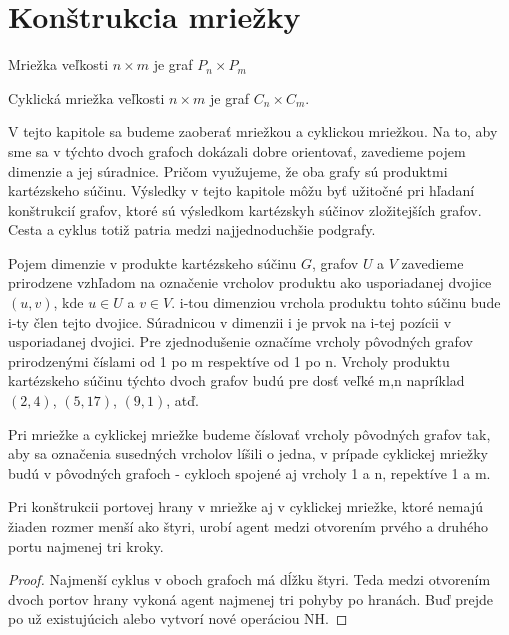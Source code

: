 \chapter{Konštrukcia mriežky}
\begin{defin}
Mriežka veľkosti $ n \times m$ je graf $P_{n} \times P_{m}$
\end{defin}
\begin{defin}
Cyklická mriežka veľkosti $n \times m$ je graf $C_{n} \times C_{m}$.
\end{defin}

V tejto kapitole sa budeme zaoberať mriežkou a cyklickou mriežkou. Na to, aby sme sa v
týchto dvoch grafoch dokázali dobre orientovať, zavedieme pojem dimenzie a
jej súradnice. Pričom využujeme, že oba grafy sú produktmi kartézskeho
súčinu. Výsledky v tejto kapitole môžu byť užitočné pri hľadaní konštrukcií
grafov, ktoré sú výsledkom kartézskyh súčinov zložitejších grafov. Cesta a
cyklus totiž patria medzi najjednoduchšie podgrafy.

\begin{ozn}
Pojem dimenzie v produkte kartézskeho súčinu $G$, grafov $U$ a $V$ 
zavedieme prirodzene vzhľadom
na označenie vrcholov produktu ako usporiadanej dvojice $(u,v)$, kde $u \in
U$ a $v \in V$. i-tou dimenziou vrchola produktu tohto súčinu bude i-ty člen
tejto dvojice. Súradnicou v dimenzii i je prvok na i-tej pozícii v
usporiadanej dvojici. Pre zjednodušenie označíme vrcholy pôvodných grafov
prirodzenými číslami od 1 po m respektíve od 1 po n. Vrcholy produktu
kartézskeho súčinu týchto dvoch grafov budú pre dosť veľké m,n napríklad
$(2,4)$, $(5,17)$, $(9,1)$, atď.
\end{ozn}

\begin{pozn}
Pri mriežke a cyklickej mriežke budeme číslovať vrcholy pôvodných grafov
tak, aby sa označenia susedných vrcholov líšili o jedna, v prípade cyklickej
mriežky budú v pôvodných grafoch - cykloch spojené aj vrcholy 1 a n,
repektíve 1 a m.
\end{pozn}

\begin{lem}
Pri konštrukcii portovej hrany v mriežke aj v cyklickej mriežke, ktoré
nemajú žiaden rozmer menší ako štyri, 
urobí agent medzi otvorením prvého a druhého
portu najmenej tri kroky.
\end{lem}
\begin{proof}
Najmenší cyklus v oboch grafoch má dĺžku štyri. 
Teda medzi otvorením dvoch portov
hrany vykoná agent najmenej tri pohyby po hranách. Buď prejde po už
existujúcich alebo vytvorí nové operáciou NH.
\end{proof}


